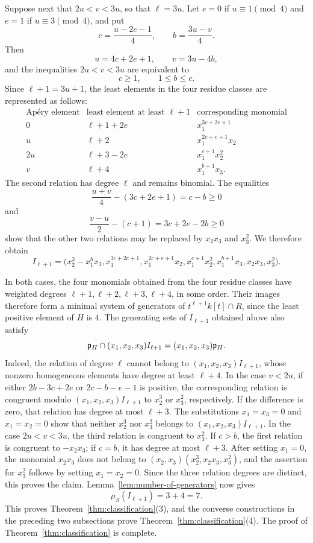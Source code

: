 Suppose next that $2u<v<3u$, so that $\ell=3u$.  Let $e=0$ if
$u\equiv1\pmod4$ and $e=1$ if $u\equiv3\pmod4$, and put
\[
 c=\frac{u-2e-1}{4},
 \qquad b=\frac{3u-v}{4}.
\]
Then
\[
 u=4c+2e+1,
 \qquad v=3u-4b,
\]
and the inequalities $2u<v<3u$ are equivalent to
\[
 c\geq1,
 \qquad 1\leq b\leq c.
\]
Since $\ell+1=3u+1$, the least elements in the four residue classes are
represented as follows:
\[
\begin{array}{c|c|c}
 \text{Ap\'ery element}&\text{least element at least }\ell+1
   &\text{corresponding monomial}\\ \hline
 0&\ell+1+2e&x_1^{3c+2e+1}\\
 u&\ell+2&x_1^{2c+e+1}x_2\\
 2u&\ell+3-2e&x_1^{c+1}x_2^2\\
 v&\ell+4&x_1^{b+1}x_3.
\end{array}
\]
The second relation has degree $\ell$ and remains binomial.  The equalities
\[
 \frac{u+v}{4}-(3c+2e+1)=c-b\geq0
\]
and
\[
 \frac{v-u}{2}-(c+1)=3c+2e-2b\geq0
\]
show that the other two relations may be replaced by $x_2x_3$ and $x_3^2$.
We therefore obtain
\[
 I_{\ell+1}=\bigl(
 x_2^3-x_1^bx_3,
 x_1^{3c+2e+1},
 x_1^{2c+e+1}x_2,
 x_1^{c+1}x_2^2,
 x_1^{b+1}x_3,
 x_2x_3,
 x_3^2
 \bigr).
\]

In both cases, the four monomials obtained from the four residue classes have
weighted degrees $\ell+1,\ell+2,\ell+3,\ell+4$, in some order.  Their images
therefore form a minimal system of generators of
$t^{\ell+1}k[t]\cap R$, since the least positive element of $H$ is $4$.
The generating sets of $I_{\ell+1}$ obtained above also satisfy
\[
 \mathfrak{p}_H\cap(x_1,x_2,x_3)I_{\ell+1}
 =(x_1,x_2,x_3)\mathfrak{p}_H.
\]
Indeed, the relation of degree $\ell$ cannot belong to
$(x_1,x_2,x_3)I_{\ell+1}$, whose nonzero homogeneous elements have degree at
least $\ell+4$.  In the case $v<2u$, if
either $2b-3c+2e$ or $2c-b-e-1$ is positive, the corresponding relation is
congruent modulo $(x_1,x_2,x_3)I_{\ell+1}$ to $x_2^3$ or $x_3^2$,
respectively.  If the difference is zero, that relation has degree at most
$\ell+3$.  The substitutions
$x_1=x_3=0$ and $x_1=x_2=0$ show that neither $x_2^3$ nor $x_3^2$ belongs to
$(x_1,x_2,x_3)I_{\ell+1}$.  In the case $2u<v<3u$, the third relation is
congruent to $x_3^2$.  If $c>b$, the first relation is congruent to
$-x_2x_3$; if $c=b$, it has degree at most $\ell+3$.  After setting $x_1=0$,
the monomial $x_2x_3$ does not belong to
$(x_2,x_3)(x_2^3,x_2x_3,x_3^2)$, and the assertion for $x_3^2$ follows by
setting $x_1=x_2=0$.  Since the three relation degrees are distinct,
this proves the claim.
Lemma~\ref{lem:number-of-generators} now gives
\[
 \mu_S(I_{\ell+1})=3+4=7.
\]
This proves Theorem~\ref{thm:classification}(3), and the converse constructions in the preceding two
subsections prove Theorem~\ref{thm:classification}(4).  The proof of Theorem~\ref{thm:classification} is complete.
